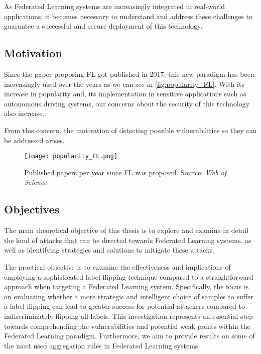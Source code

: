 As Federated Learning systems are increasingly integrated in real-world applications, it becomes necessary to understand and address these challenges to guarantee a successful and secure deployment of this technology.





\subsection{Motivation}
Since the paper proposing FL got published in 2017, this new paradigm has been increasingly used over the years as we can see in \autoref{fig:popularity_FL}.
With its increase in popularity and, its implementation in sensitive applications such as autonomous driving systems, our concerns about the security of this technology also increase.

From this concern, the motivation of detecting possible vulnerabilities so they can be addressed arises. 

\begin{figure}[h!]
        \centering %
        \texttt{[image: popularity\_FL.png]}
        \caption{Published papers per year since FL was proposed. Source: \textit{Web of Science}} %
        \label{fig:popularity_FL}
    \end{figure}

\subsection{Objectives}
The main theoretical objective of this thesis is to explore and examine in detail the kind of attacks that can be directed towards Federated Learning systems, as well as identifying strategies and solutions to mitigate these attacks. 

The practical objective is to examine the effectiveness and implications of employing a sophisticated label flipping technique compared to a straightforward approach when targeting a Federated Learning system. Specifically, the focus is on evaluating whether a more strategic and intelligent choice of samples to suffer a label flipping can lead to greater success for potential attackers compared to indiscriminately flipping all labels. This investigation represents an essential step towards comprehending the vulnerabilities and potential weak points within the Federated Learning paradigm. Furthermore, we aim to provide results on some of the most used aggregation rules in Federated Learning systems.

